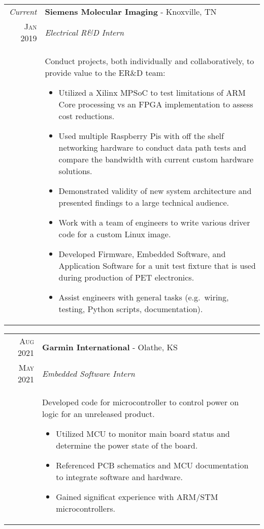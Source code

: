 \documentclass[a4paper,11pt]{article}
\begin{document}
%
%
\begin{tabularx}{\textwidth}{r|X}
   \emph{Current} & \textbf{Siemens Molecular Imaging} \-- Knoxville, TN\\
   \textsc{Jan 2019} & \emph{Electrical R\&D Intern}\\
   & \small{Conduct projects, both individually and collaboratively, to provide value to the ER\&D team:
      \begin{itemize}[leftmargin=20pt,topsep=1pt,itemsep=1pt,partopsep=0pt, parsep=1pt]
        \item Utilized a Xilinx MPSoC to test limitations of ARM Core processing vs an FPGA implementation to assess cost reductions.
        \item Used multiple Raspberry Pis with off the shelf networking hardware to conduct data path tests and compare the bandwidth with current custom hardware solutions.
        \item Demonstrated validity of new system architecture and presented findings to a large technical audience.
        \item Work with a team of engineers to write various driver code for a custom Linux image.
        \item Developed Firmware, Embedded Software, and Application Software for a unit test fixture that is used during production of PET electronics.
        \item Assist engineers with general tasks (e.g.\ wiring, testing, Python scripts, documentation).
      \vspace{-0.5cm}
      \end{itemize}}\\
\end{tabularx}

%
%
\begin{tabularx}{\textwidth}{r|X}
   \textsc{Aug 2021} & \textbf{Garmin International} \-- Olathe, KS\\
   \textsc{May 2021} & \emph{Embedded Software Intern}\\
   & \small{Developed code for microcontroller to control power on logic for an unreleased product.
      \begin{itemize}[leftmargin=20pt,topsep=1pt,itemsep=1pt,partopsep=0pt, parsep=1pt]
        \item Utilized MCU to monitor main board status and determine the power state of the board.
        \item Referenced PCB schematics and MCU documentation to integrate software and hardware.
        \item Gained significat experience with ARM/STM microcontrollers.
      \vspace{-0.5cm}
      \end{itemize}}\\
\end{tabularx}
\end{document}
